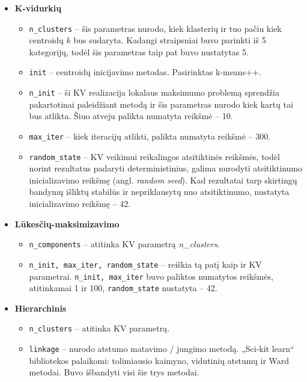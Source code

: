 \documentclass{VUMIFInfBakalaurinis}
\providecommand{\tightlist}{%
	  \setlength{\itemsep}{0pt}\setlength{\parskip}{0pt}}
\begin{document}
\begin{itemize}
\tightlist
\item
  \textbf{K-vidurkių}

  \begin{itemize}
  \item
    \texttt{n\_clusters} -- šis parametras nurodo, kiek klasterių ir tuo
    pačiu kiek centroidų $k$ bus sudaryta. Kadangi straipsniai buvo
    parinkti iš 5 kategorijų, todėl šis parametras taip pat buvo
    nustatytas 5.
  \item
    \texttt{init} -- centroidų inicijavimo metodas. Pasirinktas k-means++.
  \item
    \texttt{n\_init} -- ši KV realizacija lokalaus maksimumo problemą
    sprendžia pakartotinai paleidžiant metodą ir šis parametras nurodo
    kiek kartų tai bus atlikta. Šiuo atveju palikta numatyta reikšmė --
    10.
  \item
    \texttt{max\_iter} -- kiek iteracijų atlikti, palikta numatyta reikšmė
    -- 300.
  \item
    \texttt{random\_state} -- KV veikimui reikalingos atsitiktinės
    reikšmės, todėl norint rezultatus padaryti deterministinius, galima
    nurodyti atsitiktinumo inicializavimo reikšmę (angl. \emph{random
    seed}). Kad rezultatai tarp skirtingų bandymų išliktų stabilūs ir
    nepriklausytų nuo atsitiktinumo, nustatyta inicializavimo reikšmę --
    42.
  \end{itemize}
  \pagebreak %
\item
  \textbf{Lūkesčių-maksimizavimo}

  \begin{itemize}
  \item
    \texttt{n\_components} -- atitinka KV parametrą \emph{n\_clusters}.
  \item
    \texttt{n\_init, max\_iter, random\_state} -- reiškia tą patį kaip ir
    KV parametrai. \texttt{n\_init, max\_iter} buvo paliktos numatytos
    reikšmės, atitinkamai 1 ir 100, \texttt{random\_state} nustatyta --
    42.
  \end{itemize}
\item
  \textbf{Hierarchinis}

  \begin{itemize}
  \item
    \texttt{n\_clusters} -- atitinka KV parametrą.
  \item
    \texttt{linkage} -- nurodo atstumo matavimo / jungimo metodą. „Sci-kit
    learn“ bibliotekos palaikomi: tolimiausio kaimyno, vidutinių atstumų
    ir Ward metodai. Buvo išbandyti visi šie trys metodai.
  \end{itemize}
\end{itemize}
\end{document}
